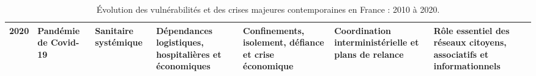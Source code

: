 \begin{table}[H]
\begin{tabularx}{\linewidth}{@{}
p{1.2cm}
p{2.2cm}
p{2.1cm}
Y
Y
Y
Y
@{}}
2020 &
Pandémie de Covid-19 &
Sanitaire systémique &
Dépendances logistiques, hospitalières et économiques &
Confinements, isolement, défiance et crise économique &
Coordination interministérielle et plans de relance &
Rôle essentiel des réseaux citoyens, associatifs et informationnels\footnotemark[\noteCrisesApresDeuxMilleCovid] \\

\bottomrule
\end{tabularx}

\caption{Évolution des vulnérabilités et des crises majeures contemporaines en France : 2010 à 2020.}
\label{tab:crises_majeures_2010_2020}
\end{table}


\clearpage

